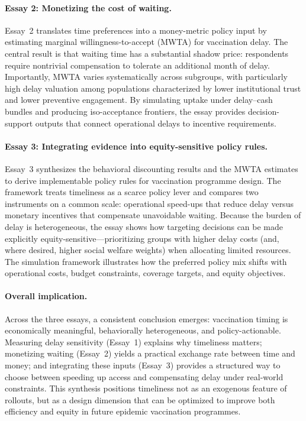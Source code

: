 \documentclass[doublespacing]{utdthesis}
\begin{document}
\paragraph{Essay 2: Monetizing the cost of waiting.}
Essay~2 translates time preferences into a money-metric policy input by estimating marginal willingness-to-accept (MWTA) for vaccination delay. The central result is that waiting time has a substantial shadow price: respondents require nontrivial compensation to tolerate an additional month of delay. Importantly, MWTA varies systematically across subgroups, with particularly high delay valuation among populations characterized by lower institutional trust and lower preventive engagement. By simulating uptake under delay--cash bundles and producing iso-acceptance frontiers, the essay provides decision-support outputs that connect operational delays to incentive requirements.

\paragraph{Essay 3: Integrating evidence into equity-sensitive policy rules.}
Essay~3 synthesizes the behavioral discounting results and the MWTA estimates to derive implementable policy rules for vaccination programme design. The framework treats timeliness as a scarce policy lever and compares two instruments on a common scale: operational speed-ups that reduce delay versus monetary incentives that compensate unavoidable waiting. Because the burden of delay is heterogeneous, the essay shows how targeting decisions can be made explicitly equity-sensitive—prioritizing groups with higher delay costs (and, where desired, higher social welfare weights) when allocating limited resources. The simulation framework illustrates how the preferred policy mix shifts with operational costs, budget constraints, coverage targets, and equity objectives.

\paragraph{Overall implication.}
Across the three essays, a consistent conclusion emerges: vaccination timing is economically meaningful, behaviorally heterogeneous, and policy-actionable. Measuring delay sensitivity (Essay~1) explains why timeliness matters; monetizing waiting (Essay~2) yields a practical exchange rate between time and money; and integrating these inputs (Essay~3) provides a structured way to choose between speeding up access and compensating delay under real-world constraints. This synthesis positions timeliness not as an exogenous feature of rollouts, but as a design dimension that can be optimized to improve both efficiency and equity in future epidemic vaccination programmes.
\end{document}
